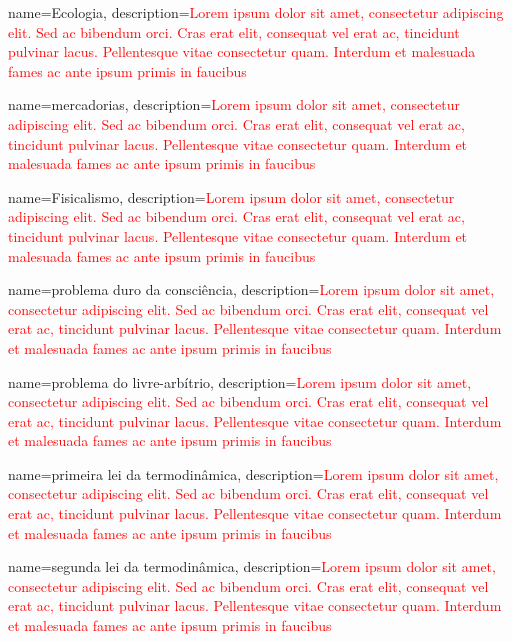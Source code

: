 {
	name=Ecologia,
	description={\textcolor{red}{Lorem ipsum dolor sit amet, consectetur adipiscing elit. Sed ac bibendum orci. Cras erat elit, consequat vel erat ac, tincidunt pulvinar lacus. Pellentesque vitae consectetur quam. Interdum et malesuada fames ac ante ipsum primis in faucibus}}
}

{
	name=mercadorias,
	description={\textcolor{red}{Lorem ipsum dolor sit amet, consectetur adipiscing elit. Sed ac bibendum orci. Cras erat elit, consequat vel erat ac, tincidunt pulvinar lacus. Pellentesque vitae consectetur quam. Interdum et malesuada fames ac ante ipsum primis in faucibus}}
}

{
	name=Fisicalismo,
	description={\textcolor{red}{Lorem ipsum dolor sit amet, consectetur adipiscing elit. Sed ac bibendum orci. Cras erat elit, consequat vel erat ac, tincidunt pulvinar lacus. Pellentesque vitae consectetur quam. Interdum et malesuada fames ac ante ipsum primis in faucibus}}
}

{
	name=problema duro da consciência,
	description={\textcolor{red}{Lorem ipsum dolor sit amet, consectetur adipiscing elit. Sed ac bibendum orci. Cras erat elit, consequat vel erat ac, tincidunt pulvinar lacus. Pellentesque vitae consectetur quam. Interdum et malesuada fames ac ante ipsum primis in faucibus}}
}

{
	name=problema do livre-arbítrio,
	description={\textcolor{red}{Lorem ipsum dolor sit amet, consectetur adipiscing elit. Sed ac bibendum orci. Cras erat elit, consequat vel erat ac, tincidunt pulvinar lacus. Pellentesque vitae consectetur quam. Interdum et malesuada fames ac ante ipsum primis in faucibus}}
}

{
	name=primeira lei da termodinâmica,
	description={\textcolor{red}{Lorem ipsum dolor sit amet, consectetur adipiscing elit. Sed ac bibendum orci. Cras erat elit, consequat vel erat ac, tincidunt pulvinar lacus. Pellentesque vitae consectetur quam. Interdum et malesuada fames ac ante ipsum primis in faucibus}}
}

{
	name=segunda lei da termodinâmica,
	description={\textcolor{red}{Lorem ipsum dolor sit amet, consectetur adipiscing elit. Sed ac bibendum orci. Cras erat elit, consequat vel erat ac, tincidunt pulvinar lacus. Pellentesque vitae consectetur quam. Interdum et malesuada fames ac ante ipsum primis in faucibus}}
}

